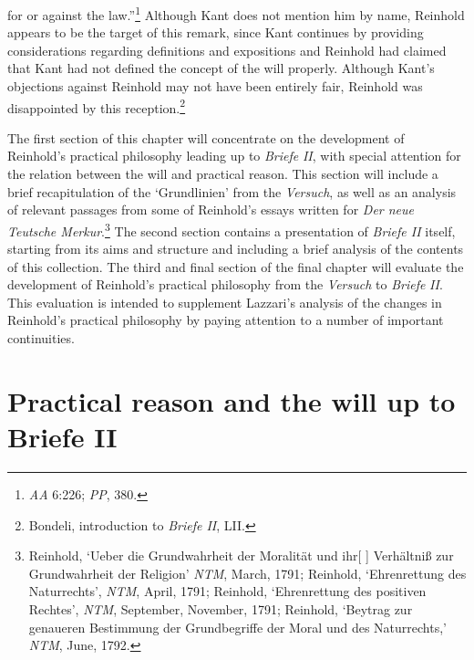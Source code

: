for or against the law.''\footnote{ \textit{AA} 6:226; \textit{PP}, 380. } Although Kant does not mention him by name, Reinhold appears to be the target of this remark, since Kant continues by providing considerations regarding definitions and expositions and Reinhold had claimed that Kant had not defined the concept of the will properly. Although Kant's objections against Reinhold may not have been entirely fair, Reinhold was disappointed by this reception.\footnote{ Bondeli, introduction to \textit{Briefe II}, LII. } 

The first section of this chapter will concentrate on the development of Reinhold's practical philosophy leading up to \textit{Briefe} \textit{II}, with special attention for the relation between the will and practical reason. This section will include a brief recapitulation of the `Grundlinien' from the \textit{Versuch}, as well as an analysis of relevant passages from some of Reinhold's essays written for \textit{Der neue Teutsche Merkur}.\footnote{\label{footnote:_Ref232222730} Reinhold, `Ueber die Grundwahrheit der Moralit\"{a}t und ihr[ ] Verh\"{a}ltni\ss{} zur Grundwahrheit der Religion' \textit{NTM}, March, 1791; Reinhold, `Ehrenrettung des Naturrechts', \textit{NTM}, April, 1791; Reinhold, `Ehrenrettung des positiven Rechtes', \textit{NTM}, September, November, 1791; Reinhold, `Beytrag zur genaueren Bestimmung der Grundbegriffe der Moral und des Naturrechts,' \textit{NTM}, June, 1792.} The second section contains a presentation of \textit{Briefe II} itself, starting from its aims and structure and including a brief analysis of the contents of this collection. The third and final section of the final chapter will evaluate the development of Reinhold's practical philosophy from the \textit{Versuch} to \textit{Briefe} \textit{II}. This evaluation is intended to supplement Lazzari's analysis of the changes in Reinhold's practical philosophy by paying attention to a number of important continuities. 


\section{Practical reason and the will up to Briefe II}


